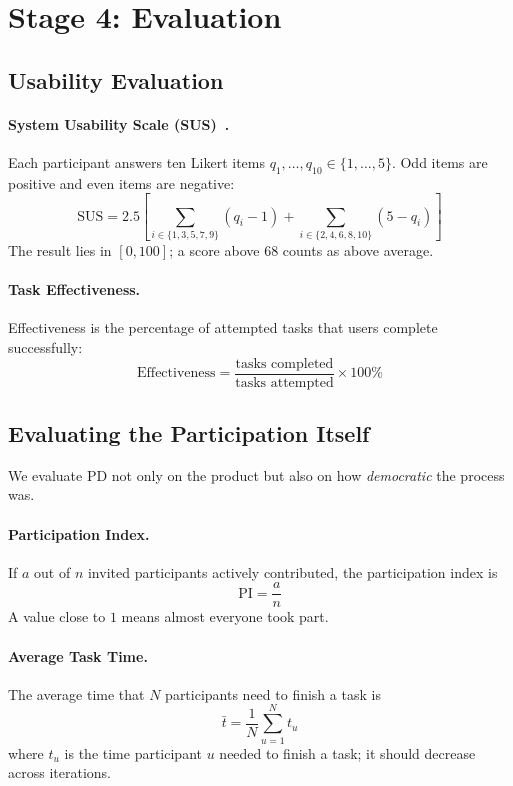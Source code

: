 \documentclass[a4paper,12pt]{article}
\begin{document}
\section{Stage 4: Evaluation}
\label{sec:eval}
\subsection{Usability Evaluation}
\paragraph{System Usability Scale (SUS)~\cite{brooke1996}.} Each participant answers ten Likert items $q_1,\dots,q_{10} \in \{1,\dots,5\}$. Odd items are positive and even items are negative:
\begin{equation}
    \text{SUS} = 2.5 \left[ \sum_{i \in \{1,3,5,7,9\}} (q_i - 1) + \sum_{i \in \{2,4,6,8,10\}} (5 - q_i) \right]
\end{equation}
The result lies in $[0,100]$; a score above $68$ counts as above average.

\paragraph{Task Effectiveness.} Effectiveness is the percentage of attempted tasks that users complete successfully:
\begin{equation}
    \text{Effectiveness} = \frac{\text{tasks completed}}{\text{tasks attempted}} \times 100\%
\end{equation}

\subsection{Evaluating the Participation Itself}
We evaluate PD not only on the product but also on how \emph{democratic} the process was.

\paragraph{Participation Index.} If $a$ out of $n$ invited participants actively contributed, the participation index is
\begin{equation}
    \text{PI} = \frac{a}{n}
\end{equation}
A value close to $1$ means almost everyone took part.

\paragraph{Average Task Time.} The average time that $N$ participants need to finish a task is
\begin{equation}
    \bar{t} = \frac{1}{N}\sum_{u=1}^{N} t_u
\end{equation}
where $t_u$ is the time participant $u$ needed to finish a task; it should decrease across iterations.
\end{document}
